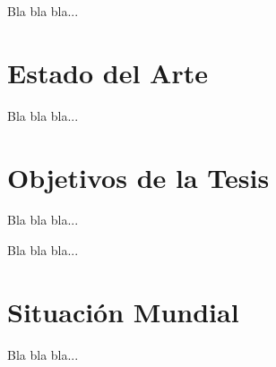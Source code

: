 \documentclass[a4paper,openright,12pt]{article}
\begin{document}


Bla bla bla...

\section{Estado del Arte}


Bla bla bla...

\section{Objetivos de la Tesis}

Bla bla bla...


Bla bla bla...

\section{Situación Mundial}

Bla bla bla...
\end{document}
